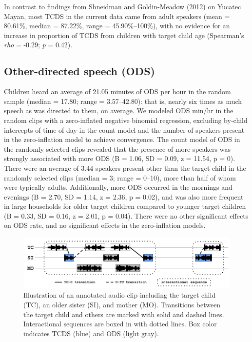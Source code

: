 \documentclass[floatsintext,man]{apa6}
\theoremstyle{definition}
\theoremstyle{definition}
\theoremstyle{definition}
\theoremstyle{remark}
\begin{document}
In contrast to findings from Shneidman and Goldin-Meadow (2012) on
Yucatec Mayan, most TCDS in the current data came from adult speakers
(mean = 80.61\%, median = 87.22\%, range = 45.90\%--100\%), with no
evidence for an increase in proportion of TCDS from children with target
child age (Spearman's \emph{rho} = -0.29; \emph{p} = 0.42).

\subsection{Other-directed speech
(ODS)}\label{other-directed-speech-ods}

Children heard an average of 21.05 minutes of ODS per hour in the random
sample (median = 17.80; range = 3.57--42.80): that is, nearly six times
as much speech as was directed to them, on average. We modeled ODS
min/hr in the random clips with a zero-inflated negative binomial
regression, excluding by-child intercepts of time of day in the count
model and the number of speakers present in the zero-inflation model to
achieve convergence. The count model of ODS in the randomly selected
clips revealed that the presence of more speakers was strongly
associated with more ODS (B = 1.06, SD = 0.09, z = 11.54, p = 0). There
were an average of 3.44 speakers present other than the target child in
the randomly selected clips (median = 3; range = 0--10), more than half
of whom were typically adults. Additionally, more ODS occurred in the
mornings and evenings (B = 2.70, SD = 1.14, z = 2.36, p = 0.02), and was
also more frequent in large households for older target children
compared to younger target children (B = 0.33, SD = 0.16, z = 2.01, p =
0.04). There were no other significant effects on ODS rate, and no
significant effects in the zero-inflation models.

\begin{figure}

{\centering \includegraphics[width=1\linewidth]{Tseltal-CLE_files/TseltalCLE-TurnTimingIllustration} 

}

\caption{Illustration of an annotated audio clip including the target child (TC), an older sister (SI), and mother (MO). Transitions between the target child and others are marked with solid and dashed lines. Interactional sequences are boxed in with dotted lines. Box color indicates TCDS (blue) and ODS (light gray).}\label{fig:fig6}
\end{figure}
\end{document}
